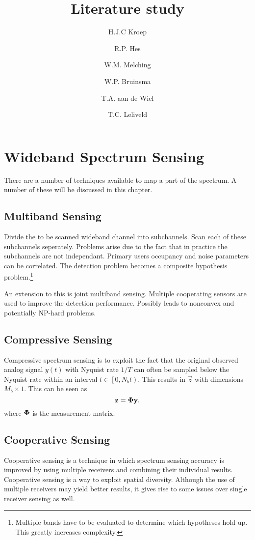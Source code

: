 \documentclass[report]{memoir}
\title{Literature study}
\author{H.J.C Kroep \and R.P. Hes \and W.M. Melching \and W.P. Bruinsma \and T.A. aan de Wiel \and T.C. Leliveld}
\begin{document}
\chapter{Wideband Spectrum Sensing}
There are a number of techniques available to map a part of the spectrum. A number of these will be discussed in this chapter.

\section{Multiband Sensing}
Divide the to be scanned wideband channel into subchannels. Scan each of these subchannels seperately. Problems arise due to the fact that in practice the subchannels are not independant. Primary users occupancy and noise parameters can be correlated. The detection problem becomes a composite hypothesis problem.\footnote{Multiple bands have to be evaluated to determine which hypotheses hold up. This greatly increases complexity.}

An extension to this is joint multiband sensing. Multiple cooperating sensors are used to improve the detection performance. Possibly leads to nonconvex and potentially NP-hard problems.

\section{Compressive Sensing}
Compressive spectrum sensing is to exploit the fact that the original observed analog signal $y(t)$ with Nyquist rate $1/T$ can often be sampled below the Nyquist rate within an interval $t\in \left[0,N_{b}t \right)$. This results in $\vec{z}$ with dimensions $M_b \times 1$. This can be seen as
\begin{equation}
    \label{eq:nonuniformsampling}
    \boldsymbol{\mathbf{z}} = \boldsymbol{\mathbf{\Phi}}\boldsymbol{\mathbf{y}}.
\end{equation}
where $\boldsymbol{\mathbf{\Phi}}$ is the measurement matrix.

\section{Cooperative Sensing}
Cooperative sensing is a technique in which spectrum sensing accuracy is improved by using multiple receivers and combining their individual results. Cooperative sensing is a way to exploit spatial diversity.
Although the use of multiple receivers may yield better results, it gives rise to some issues over single receiver sensing as well.
\end{document}

